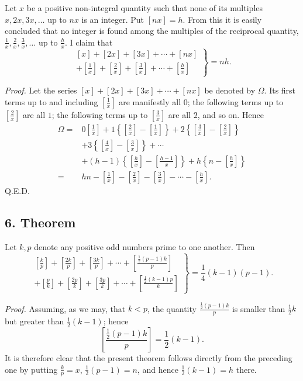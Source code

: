 \documentclass[12pt]{article}
\begin{document}
Let $x$ be a positive non-integral quantity such that none of its multiples $x,2x,3x,\ldots$ up to $nx$ is an integer. Put $[nx]=h$. From this it is easily concluded that no integer is found among the multiples of the reciprocal quantity, $\frac1x,\frac2x,\frac3x,\ldots$ up to $\frac hx$. I claim that
\[
\left.
\begin{array}{l}
[x]+[2x]+[3x]+\cdots+[nx]\\
+\left[\frac1x\right]+\left[\frac2x\right]+\left[\frac3x\right]+\cdots+\left[\frac hx\right]
\end{array}
\right\}=nh.
\]

\emph{Proof.} Let the series $[x]+[2x]+[3x]+\cdots+[nx]$ be denoted by $\Omega$. Its first terms up to and including $\left[\frac1x\right]$ are manifestly all $0$; the following terms up to $\left[\frac2x\right]$ are all $1$; the following terms up to $\left[\frac3x\right]$ are all $2$, and so on. Hence
\[
\begin{aligned}
\Omega={}&0\left[\frac1x\right]
+1\left\{\left[\frac2x\right]-\left[\frac1x\right]\right\}
+2\left\{\left[\frac3x\right]-\left[\frac2x\right]\right\}\\
&+3\left\{\left[\frac4x\right]-\left[\frac3x\right]\right\}+\cdots\\
&+(h-1)\left\{\left[\frac hx\right]-\left[\frac{h-1}{x}\right]\right\}
+h\left\{n-\left[\frac hx\right]\right\}\\
={}&hn-\left[\frac1x\right]-\left[\frac2x\right]-\left[\frac3x\right]-\cdots-\left[\frac hx\right].
\end{aligned}
\]
Q.E.D.

\subsection*{6. Theorem}

Let $k,p$ denote any positive odd numbers prime to one another. Then
\[
\left.
\begin{array}{l}
\left[\frac{k}{p}\right]+\left[\frac{2k}{p}\right]+\left[\frac{3k}{p}\right]+\cdots+\left[\frac{\frac12(p-1)k}{p}\right]\\
+\left[\frac{p}{k}\right]+\left[\frac{2p}{k}\right]+\left[\frac{3p}{k}\right]+\cdots+\left[\frac{\frac12(k-1)p}{k}\right]
\end{array}
\right\}
=\frac14(k-1)(p-1).
\]

\emph{Proof.} Assuming, as we may, that $k<p$, the quantity $\frac{\frac12(p-1)k}{p}$ is smaller than $\frac12k$ but greater than $\frac12(k-1)$; hence
\[
\left[\frac{\frac12(p-1)k}{p}\right]=\frac12(k-1).
\]
It is therefore clear that the present theorem follows directly from the preceding one by putting $\frac{k}{p}=x$, $\frac12(p-1)=n$, and hence $\frac12(k-1)=h$ there.
\end{document}
